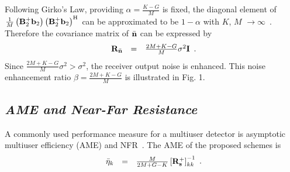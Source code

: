 \documentclass[conference]{IEEEtran}
\newcommand{\bb}{{\bf b}}
\newcommand{\bs}{{\bf s}}
\newcommand{\bn}{{\bf n}}
\newcommand{\bI}{{\bf I}}
\newcommand{\bR}{{\bf R}}
\newcommand{\bB}{{\bf B}}
\begin{document}
Following Girko's Law, providing $\alpha=\frac{K-G}{M}$ is fixed,
the diagonal element of
$\frac{1}{M}\left(\bB_2^{+}\bb_2\right)\left(\bB_2^{+}\bb_2\right)^{\rm
H}$ can be approximated to be $1-\alpha$ with $K$, $M$
$\rightarrow\infty$~\cite{Muller}. Therefore the covariance matrix
of $\bar\bn$ can be expressed by
\begin{equation}
\begin{array}{rcl}
\bR_{\bar\bn}&=&\frac{2M+K-G}{M}\sigma^{2}\bI
\end{array}.\label{noise_var_new}
\end{equation}
\noindent Since $\frac{2M+K-G}{M}\sigma^{2}>\sigma^{2}$, the
receiver output noise is enhanced. This noise enhancement ratio
$\beta=\frac{2M+K-G}{M}$ is illustrated in Fig. 1.
\begin{figure}\label{BER_SNR}
\end{figure}
\subsection{\em AME and Near-Far Resistance}
A commonly used performance measure for a multiuser detector is
asymptotic multiuser efficiency (AME) and NFR~\cite{Verd98}. The
AME of the proposed schemes is
\begin{equation}
\begin{array}{rcl}
\bar{\eta}_k&=&{\frac{M}{2M+G-K}}\left[\bR_{\bs}^{+}\right]_{kk}^{-1}
\end{array}.
\end{equation}
\end{document}
